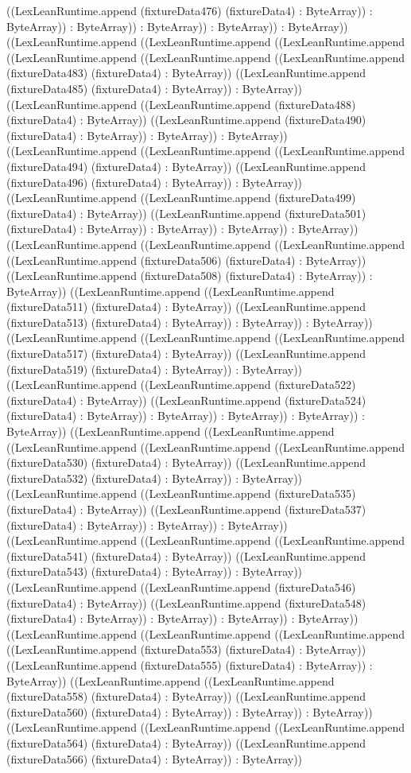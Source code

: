 \documentclass[11pt]{article}
\begin{document}
((LexLeanRuntime.append (fixtureData476) (fixtureData4) : ByteArray)) : ByteArray)) : ByteArray)) : ByteArray)) : ByteArray)) : ByteArray)) ((LexLeanRuntime.append ((LexLeanRuntime.append ((LexLeanRuntime.append ((LexLeanRuntime.append ((LexLeanRuntime.append ((LexLeanRuntime.append (fixtureData483) (fixtureData4) : ByteArray)) ((LexLeanRuntime.append (fixtureData485) (fixtureData4) : ByteArray)) : ByteArray)) ((LexLeanRuntime.append ((LexLeanRuntime.append (fixtureData488) (fixtureData4) : ByteArray)) ((LexLeanRuntime.append (fixtureData490) (fixtureData4) : ByteArray)) : ByteArray)) : ByteArray)) ((LexLeanRuntime.append ((LexLeanRuntime.append ((LexLeanRuntime.append (fixtureData494) (fixtureData4) : ByteArray)) ((LexLeanRuntime.append (fixtureData496) (fixtureData4) : ByteArray)) : ByteArray)) ((LexLeanRuntime.append ((LexLeanRuntime.append (fixtureData499) (fixtureData4) : ByteArray)) ((LexLeanRuntime.append (fixtureData501) (fixtureData4) : ByteArray)) : ByteArray)) : ByteArray)) : ByteArray)) ((LexLeanRuntime.append ((LexLeanRuntime.append ((LexLeanRuntime.append ((LexLeanRuntime.append (fixtureData506) (fixtureData4) : ByteArray)) ((LexLeanRuntime.append (fixtureData508) (fixtureData4) : ByteArray)) : ByteArray)) ((LexLeanRuntime.append ((LexLeanRuntime.append (fixtureData511) (fixtureData4) : ByteArray)) ((LexLeanRuntime.append (fixtureData513) (fixtureData4) : ByteArray)) : ByteArray)) : ByteArray)) ((LexLeanRuntime.append ((LexLeanRuntime.append ((LexLeanRuntime.append (fixtureData517) (fixtureData4) : ByteArray)) ((LexLeanRuntime.append (fixtureData519) (fixtureData4) : ByteArray)) : ByteArray)) ((LexLeanRuntime.append ((LexLeanRuntime.append (fixtureData522) (fixtureData4) : ByteArray)) ((LexLeanRuntime.append (fixtureData524) (fixtureData4) : ByteArray)) : ByteArray)) : ByteArray)) : ByteArray)) : ByteArray)) ((LexLeanRuntime.append ((LexLeanRuntime.append ((LexLeanRuntime.append ((LexLeanRuntime.append ((LexLeanRuntime.append (fixtureData530) (fixtureData4) : ByteArray)) ((LexLeanRuntime.append (fixtureData532) (fixtureData4) : ByteArray)) : ByteArray)) ((LexLeanRuntime.append ((LexLeanRuntime.append (fixtureData535) (fixtureData4) : ByteArray)) ((LexLeanRuntime.append (fixtureData537) (fixtureData4) : ByteArray)) : ByteArray)) : ByteArray)) ((LexLeanRuntime.append ((LexLeanRuntime.append ((LexLeanRuntime.append (fixtureData541) (fixtureData4) : ByteArray)) ((LexLeanRuntime.append (fixtureData543) (fixtureData4) : ByteArray)) : ByteArray)) ((LexLeanRuntime.append ((LexLeanRuntime.append (fixtureData546) (fixtureData4) : ByteArray)) ((LexLeanRuntime.append (fixtureData548) (fixtureData4) : ByteArray)) : ByteArray)) : ByteArray)) : ByteArray)) ((LexLeanRuntime.append ((LexLeanRuntime.append ((LexLeanRuntime.append ((LexLeanRuntime.append (fixtureData553) (fixtureData4) : ByteArray)) ((LexLeanRuntime.append (fixtureData555) (fixtureData4) : ByteArray)) : ByteArray)) ((LexLeanRuntime.append ((LexLeanRuntime.append (fixtureData558) (fixtureData4) : ByteArray)) ((LexLeanRuntime.append (fixtureData560) (fixtureData4) : ByteArray)) : ByteArray)) : ByteArray)) ((LexLeanRuntime.append ((LexLeanRuntime.append ((LexLeanRuntime.append (fixtureData564) (fixtureData4) : ByteArray)) ((LexLeanRuntime.append (fixtureData566) (fixtureData4) : ByteArray)) : ByteArray)) 
\end{document}
